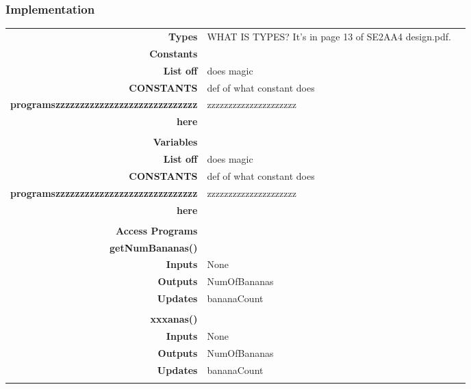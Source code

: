 \documentclass[10pt]{article}
\begin{document}
    \subsubsection{Implementation}
        \begin{tabularx}{\linewidth}{ >{\bfseries}r Xp{5cm} }
            Types           & WHAT IS TYPES? It's in page 13 of SE2AA4 design.pdf. \\
            
            Constants       & \begin{tabular}[t]{l l} 
                                 & \\
                                List off & does magic \\
                                CONSTANTS & def of what constant does \\
                                programszzzzzzzzzzzzzzzzzzzzzzzzzzzzz & zzzzzzzzzzzzzzzzzzzzz \\
                                here & \\ 
                            \end{tabular} \\
                              
            Variables       & \begin{tabular}[t]{l l} 
                                     & \\
                                    List off & does magic \\
                                    CONSTANTS & def of what constant does \\
                                    programszzzzzzzzzzzzzzzzzzzzzzzzzzzzz & zzzzzzzzzzzzzzzzzzzzz \\
                                    here & \\ 
                              \end{tabular} \\

            Access Programs & \begin{tabular}[t]{l l} 
                                     & \\
                                    \bf{getNumBananas()} & \\
                                    Inputs & None \\
                                    Outputs & NumOfBananas \\
                                    Updates & bananaCount \\ 
                                     & \\
                                    \bf{xxxanas()} & \\
                                    Inputs & None \\
                                    Outputs & NumOfBananas \\
                                    Updates & bananaCount \\ 
                              \end{tabular} \\
                              
        \end{tabularx}
        
\end{document}
